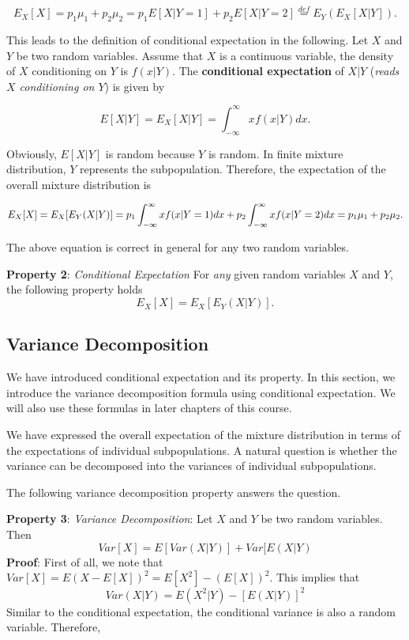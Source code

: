 \documentclass[
]{book}
\begin{document}
\[
E_X[X]  = p_1\mu_1 +p_2\mu_2 = p_1E[X|Y=1] + p_2E[X|Y=2] \stackrel{def}{=} E_Y(E_X[X|Y]).
\]

This leads to the definition of conditional expectation in the following. Let \(X\) and \(Y\) be two random variables. Assume that \(X\) is a continuous variable, the density of \(X\) conditioning on \(Y\) is \(f(x|Y)\). The \textbf{conditional expectation} of \(X|Y\) (\emph{reads \(X\) conditioning on \(Y\)}) is given by

\[
E[X|Y] = E_X[X|Y] = \int_{-\infty}^\infty xf(x|Y)dx.
\]

Obviously, \(E[X|Y]\) is random because \(Y\) is random. In finite mixture distribution, \(Y\) represents the subpopulation. Therefore, the expectation of the overall mixture distribution is

\[
E_X[X] = E_X[E_Y(X|Y)] = p_1\int_{-\infty}^\infty xf(x|Y=1)dx + p_2 \int_{-\infty}^\infty xf(x|Y=2)dx \\ = p_1\mu_1 + p_2\mu_2.
\]

The above equation is correct in general for any two random variables.

\textbf{Property 2}: \emph{Conditional Expectation} For \emph{any} given random variables \(X\) and \(Y\), the following property holds
\[
E_X[X] = E_X[E_Y(X|Y)] .
\]

\hfill\break

\hypertarget{variance-decomposition}{%
\subsection{Variance Decomposition}\label{variance-decomposition}}

We have introduced conditional expectation and its property. In this section, we introduce the variance decomposition formula using conditional expectation. We will also use these formulas in later chapters of this course.

We have expressed the overall expectation of the mixture distribution in terms of the expectations of individual subpopulations. A natural question is whether the variance can be decomposed into the variances of individual subpopulations.

The following variance decomposition property answers the question.

\textbf{Property 3}: \emph{Variance Decomposition}: Let \(X\) and \(Y\) be two random variables. Then
\[
Var[X] = E[Var(X|Y)] + Var[E(X|Y)
\]
\textbf{Proof}: First of all, we note that \(Var[X] = E(X - E[X])^2 = E[X^2] - (E[X])^2\).
This implies that
\[
Var(X|Y) = E(X^2|Y) - [E(X|Y)]^2
\]
Similar to the conditional expectation, the conditional variance is also a random variable. Therefore,
\end{document}
